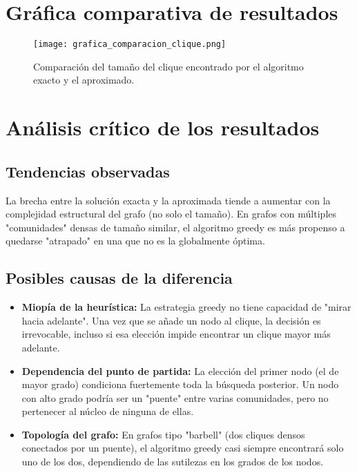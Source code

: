 \documentclass[12pt,a4paper]{report}
\begin{document}
\section{Gráfica comparativa de resultados}

\begin{figure}[H]
    \centering
    \texttt{[image: grafica\_comparacion\_clique.png]}
    \caption{Comparación del tamaño del clique encontrado por el algoritmo exacto y el aproximado.}
    \label{fig:grafica_comparacion}
\end{figure}

\section{Análisis crítico de los resultados}

\subsection{Tendencias observadas}
La brecha entre la solución exacta y la aproximada tiende a aumentar con la complejidad estructural del grafo (no solo el tamaño). En grafos con múltiples "comunidades" densas de tamaño similar, el algoritmo greedy es más propenso a quedarse "atrapado" en una que no es la globalmente óptima.

\subsection{Posibles causas de la diferencia}
\begin{itemize}
    \item \textbf{Miopía de la heurística:} La estrategia greedy no tiene capacidad de "mirar hacia adelante". Una vez que se añade un nodo al clique, la decisión es irrevocable, incluso si esa elección impide encontrar un clique mayor más adelante.
    \item \textbf{Dependencia del punto de partida:} La elección del primer nodo (el de mayor grado) condiciona fuertemente toda la búsqueda posterior. Un nodo con alto grado podría ser un "puente" entre varias comunidades, pero no pertenecer al núcleo de ninguna de ellas.
    \item \textbf{Topología del grafo:} En grafos tipo "barbell" (dos cliques densos conectados por un puente), el algoritmo greedy casi siempre encontrará solo uno de los dos, dependiendo de las sutilezas en los grados de los nodos.
\end{itemize}
\end{document}
